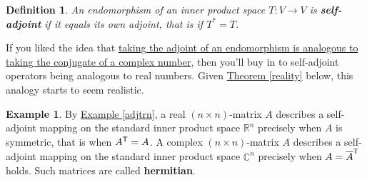 \documentclass[11pt]{amsbook}
\newtheorem{definition}[theorem]{Definition}
\theoremstyle{definition}
\newtheorem{ex}[theorem]{Example}
\begin{document}
\begin{definition} An endomorphism of an inner product space $T:V\to V$ is  {\bf self-adjoint} if it equals its own adjoint, that is if $T^{\ast} = T$. \end{definition}

If you liked the idea that \href{http://golem.ph.utexas.edu/category/2013/08/linear_operators_done_right.html}{taking the adjoint of an endomorphism is analogous to taking the conjugate of a complex number}, then you'll buy in to self-adjoint operators being analogous to real numbers. Given \hyperref[reality]{Theorem \ref{reality}} below, this analogy starts to seem realistic.

\begin{ex} By \hyperref[adjtrn]{Example \ref{adjtrn}}, a real $(n\times n)$-matrix $A$ describes a self-adjoint mapping on the standard inner product space $\mathbb{R}^n$ precisely when $A$ is symmetric, that is when $A^{\sf T} = A$. A complex $(n\times n)$-matrix $A$ describes a self-adjoint mapping on the standard inner product space $\mathbb{C}^n$ precisely when $A = \overline{A}^{\sf T}$ holds. Such matrices are called {\bf hermitian}.
\end{ex}
\end{document}

